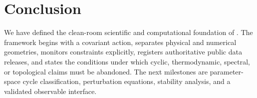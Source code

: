 \section{Conclusion}
\label{sec:conclusion}

We have defined the clean-room scientific and computational foundation of \SCPC. The framework begins with a covariant action, separates physical and numerical geometries, monitors constraints explicitly, registers authoritative public data releases, and states the conditions under which cyclic, thermodynamic, spectral, or topological claims must be abandoned. The next milestones are parameter-space cycle classification, perturbation equations, stability analysis, and a validated observable interface.
